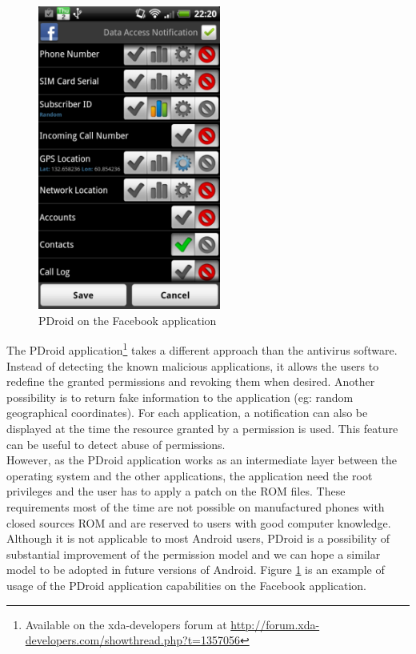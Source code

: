 \begin{figure}[h]
  \centering
  \includegraphics[width=6cm]{images/pdroid.png}
  \caption{PDroid on the Facebook application}
  \label{fig:pdroid}
\end{figure}


The PDroid application\footnote{Available on the xda-developers forum at \url{http://forum.xda-developers.com/showthread.php?t=1357056}} takes a different approach than the antivirus software.
Instead of detecting the known malicious applications, it allows the users to redefine the granted permissions and revoking them when desired.
Another possibility is to return fake information to the application (eg: random geographical coordinates).
For each application, a notification can also be displayed at the time the resource granted by a permission is used.
This feature can be useful to detect abuse of permissions.\\

However, as the PDroid application works as an intermediate layer between the operating system and the other applications, the application need the root privileges and the user has to apply a patch on the ROM files.
These requirements most of the time are not possible on manufactured phones with closed sources ROM and are reserved to users with good computer knowledge.
Although it is not applicable to most Android users, PDroid is a possibility of substantial improvement of the permission model and we can hope a similar model to be adopted in future versions of Android.
Figure \ref{fig:pdroid} is an example of usage of the PDroid application capabilities on the Facebook application.


